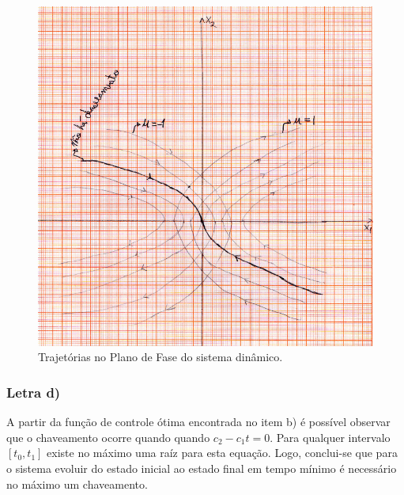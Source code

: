 \documentclass{article}
\begin{document}
         \begin{figure}[H]
            \centering
            \includegraphics[scale=1]{plano_fase_1.png}
            \caption{Trajetórias no Plano de Fase do sistema dinâmico.}
            \label{plano_fase}
        \end{figure}
         
        \subsubsection{Letra d)}
            A partir da função de controle ótima encontrada no item b) é possível observar que o chaveamento ocorre quando quando $ c_{2}-c_{1}t = 0$. Para qualquer intervalo $[t_{0},t_{1}]$ existe no máximo uma raíz para esta equação. Logo, conclui-se que para o sistema evoluir do estado inicial ao estado final em tempo mínimo é necessário no máximo um chaveamento.
\end{document}
